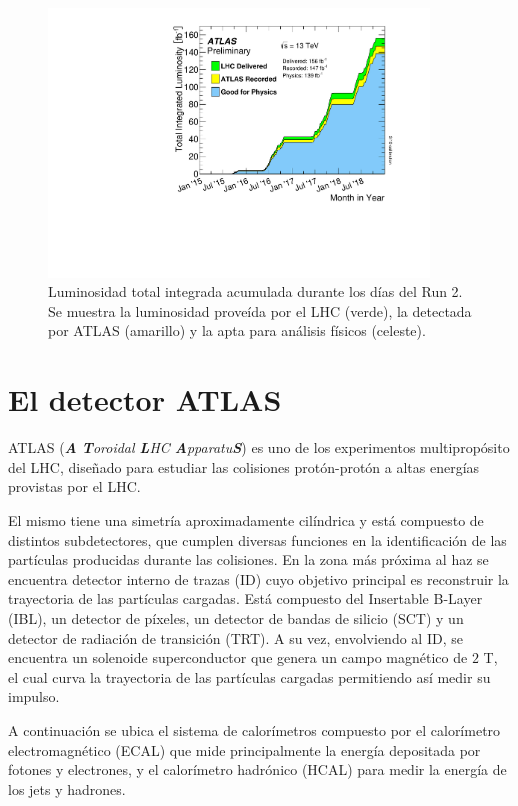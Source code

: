\begin{figure}
  \centering
  \includegraphics[width=0.9\textwidth]{images/lhc/intlumivstimeRun2DQall.pdf}
  \caption{Luminosidad total integrada acumulada durante los días del Run 2. Se muestra la luminosidad proveída por el LHC (verde), la detectada por ATLAS (amarillo) y la apta para análisis físicos (celeste).}
  \label{fig:run2_lumi}
\end{figure}



\section{El detector ATLAS}


ATLAS (\textit{\textbf{A} \textbf{T}oroidal \textbf{L}HC \textbf{A}pparatu\textbf{S}})  \cite{PERF-2007-01} es uno de los experimentos multipropósito del LHC, diseñado para estudiar las colisiones protón-protón a altas energías provistas por el LHC.

El mismo tiene una simetría aproximadamente cilíndrica y está compuesto de distintos subdetectores, que cumplen diversas funciones en la identificación de las partículas producidas durante las colisiones. En la zona más próxima al haz se encuentra detector interno de trazas (ID) cuyo objetivo principal es reconstruir la trayectoria de las partículas cargadas. Está compuesto del Insertable B-Layer (IBL), un detector de píxeles, un detector de bandas de silicio (SCT) y un detector de radiación de transición (TRT). A su vez, envolviendo al ID, se encuentra un solenoide superconductor que genera un campo magnético de $2$ T, el cual curva la trayectoria de las partículas cargadas permitiendo así medir su impulso.

A continuación se ubica el sistema de calorímetros compuesto por el calorímetro electromagnético (ECAL) que mide principalmente la energía depositada por fotones y electrones, y el calorímetro hadrónico (HCAL) para medir la energía de los jets y hadrones.

